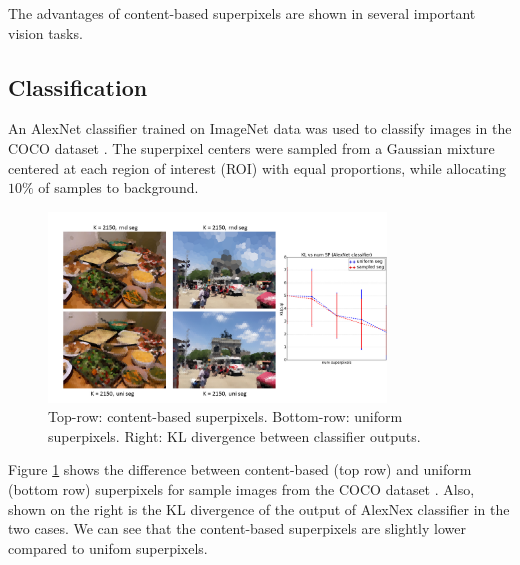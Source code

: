 The advantages of content-based superpixels are shown in several important vision tasks.

\subsection{Classification}

An AlexNet classifier trained on ImageNet data \cite{alex2012net} was used to classify images in the COCO dataset \cite{coco14data}. The superpixel centers were sampled from a Gaussian mixture centered at each region of interest (ROI) with equal proportions, while allocating $10\%$ of samples to background.

\begin{figure}[h]
	\centering
	\includegraphics[width=0.8\textwidth, trim={10 10 10 10}]{figures/coco_merged.png}
	\caption{Top-row: content-based superpixels. Bottom-row: uniform superpixels. Right: KL divergence between classifier outputs.}
    \label{fig:coco}
\end{figure}

Figure \ref{fig:coco} shows the difference between content-based (top row) and uniform (bottom row) superpixels for sample images from the COCO dataset \cite{coco14data}. Also, shown on the right is the KL divergence of the output of AlexNex classifier in the two cases. We can see that the content-based superpixels are slightly lower compared to unifom superpixels.


